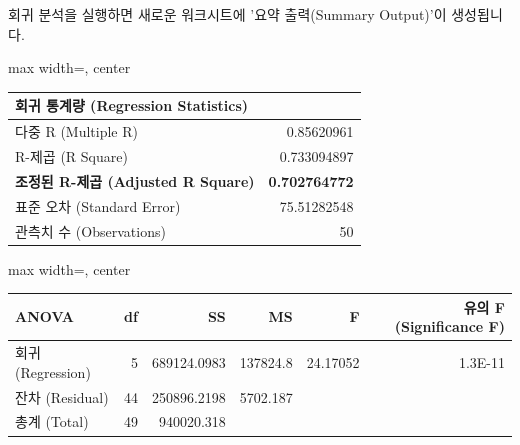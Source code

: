 \documentclass[11pt,a4paper]{article}
\theoremstyle{definition}
\begin{document}
\begin{tcolorbox}[title=\textbf{초기 Excel 출력 결과 해석}]
회귀 분석을 실행하면 새로운 워크시트에 '요약 출력(Summary Output)'이 생성됩니다.

\begin{adjustbox}{max width=\textwidth, center}
\begin{tabular}{l r}
\toprule
\textbf{회귀 통계량 (Regression Statistics)} & \\
\midrule
다중 R (Multiple R) & 0.85620961 \\
R-제곱 (R Square) & 0.733094897 \\
\textbf{조정된 R-제곱 (Adjusted R Square)} & \textbf{0.702764772} \\
표준 오차 (Standard Error) & 75.51282548 \\
관측치 수 (Observations) & 50 \\
\bottomrule
\end{tabular}
\end{adjustbox}

\vspace{0.5em}

\begin{adjustbox}{max width=\textwidth, center}
\begin{tabular}{l r r r r r}
\toprule
\textbf{ANOVA} & \textbf{df} & \textbf{SS} & \textbf{MS} & \textbf{F} & \textbf{유의 F (Significance F)} \\
\midrule
회귀 (Regression) & 5 & 689124.0983 & 137824.8 & 24.17052 & 1.3E-11 \\
잔차 (Residual) & 44 & 250896.2198 & 5702.187 & & \\
총계 (Total) & 49 & 940020.318 & & & \\
\bottomrule
\end{tabular}
\end{adjustbox}

\vspace{0.5em}


\end{tcolorbox}
\end{document}
